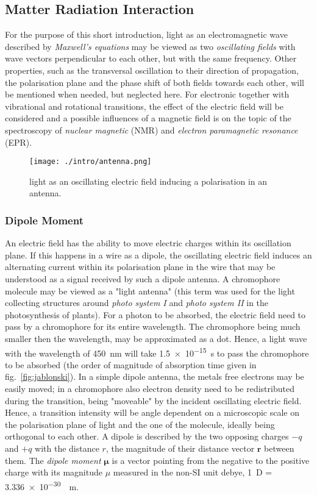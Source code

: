 		\subsection{Matter Radiation Interaction}
		For the purpose of this short introduction, light as an electromagnetic wave described by \emph{Maxwell's equations} may be viewed as two \emph{oscillating fields} with wave vectors perpendicular to each other, but with the same frequency. Other properties, such as the transversal oscillation to their direction of propagation, the polarisation plane and the phase shift of both fields towards each other, will be mentioned when needed, but neglected here. For electronic together with vibrational and rotational transitions, the effect of the electric field will be considered and a possible influences of a magnetic field is on the topic of the spectroscopy of \emph{nuclear magnetic} (NMR) and \emph{electron paramagnetic resonance} (EPR). 

		\begin{figure}[!h]
			\centering
			\label{fig:antenna}
			\texttt{[image: ./intro/antenna.png]}
			\caption{light as an oscillating electric field inducing a polarisation in an antenna.}
		\end{figure}

			\subsubsection{Dipole Moment}%
			An electric field has the ability to move electric charges within its oscillation plane. If this happens in a wire as a dipole, the oscillating electric field induces an alternating current within its polarisation plane in the wire that may be understood as a signal received by such a dipole antenna. A chromophore molecule may be viewed as a "light antenna" (this term was used for the light collecting structures around \emph{photo system I}  and \emph{photo system II} in the photosynthesis of plants). For a photon to be absorbed, the electric field need to pass by a chromophore for its entire wavelength. The chromophore being much smaller then the wavelength, may be approximated as a dot. Hence, a light wave with the wavelength of \qty{450}{\nm} will take \qty{1.5e-15}{\s} to pass the chromophore to be absorbed (the order of magnitude of absorption time given in fig.~\ref{fig:jablonski}). In a simple dipole antenna, the metals free electrons may be easily moved; in a chromophore also electron density need to be redistributed during the transition, being "moveable" by the incident oscillating electric field. Hence, a transition intensity will be angle dependent on a microscopic scale on the polarisation plane of light and the one of the molecule, ideally being orthogonal to each other. A dipole is described by the two opposing charges $-q$ and $+q$ with the distance $r$, the magnitude of their distance vector $\bm{r}$ between them. The \emph{dipole moment} $\bm{\mu}$ is a vector pointing from the negative to the positive charge with its magnitude $\mu$ measured in the non-SI unit debye, \qty{1}{D} = \qty{3.336e-30}{\C\m}.

